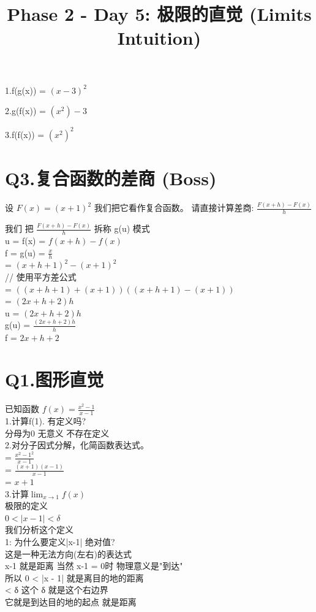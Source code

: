 \documentclass[12pt]{article}
\begin{document}
1.f(g(x))
= $(x-3)^{2}$

2.g(f(x))
= $(x^{2})-3$

3.f(f(x))
= $(x^{2})^{2}$


\section*{Q3.复合函数的差商 (Boss)}
设 $F(x) = (x + 1)^{2}$ 我们把它看作复合函数。
请直接计算差商:
$\frac{F(x+h) - F(x)}{h}$

我们 把 $\frac{F(x+h) - F(x)}{h}$ 拆称 g(u) 模式\\
u = f(x) = $f(x+ h) - f(x)$\\
f = g(u) = $\frac{x}{h}$\\
= $(x+h+1)^{2} - (x+1)^2$\\
// 使用平方差公式 \\
= $((x+h+1) +(x+1)) ((x+h+1) - (x+1))$\\
= $(2x+h+2)h$\\
u = $(2x+h+2)h$\\
g(u) = $\frac{(2x+h+2)h}{h}$\\
f = $2x+h+2$\\


\title{Phase 2 - Day 5: 极限的直觉 (Limits Intuition)}
\section*{Q1.图形直觉}
已知函数 $f(x) = \frac{x^{2}-1}{x-1}$ \\
1.计算f(1). 有定义吗?\\
分母为0 无意义 不存在定义\\
2.对分子因式分解，化简函数表达式。\\
= $\frac{x^{2}- 1^{2}}{x-1}$\\
= $\frac{(x+1)(x-1)}{x-1}$\\
= $x+1$\\
3.计算$\lim_{x \to 1}f(x)$ \\
极限的定义 \\ 
$ 0 < |x - 1| < δ $ \\
我们分析这个定义 \\ 
1: 为什么要定义|x-1| 绝对值? \\
这是一种无法方向(左右)的表达式 \\ 
x-1 就是距离 当然 x-1 = 0时 物理意义是"到达" \\
所以 0 < |x - 1| 就是离目的地的距离 \\
< δ 这个 δ 就是这个右边界 \\
它就是到达目的地的起点 就是距离 \\ 
\end{document}
